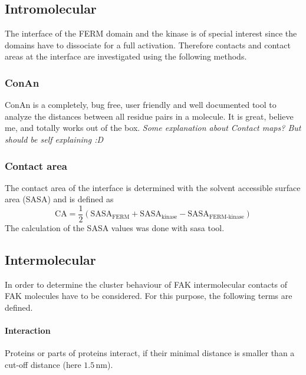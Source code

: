 \subsection{Intromolecular}
The interface of the FERM domain and the kinase is of special interest since the domains have to dissociate for a full activation. Therefore contacts and contact areas at the interface are investigated using the following methods.\\
\subsubsection{ConAn}
ConAn is a completely, bug free, user friendly and well documented tool to analyze the distances between all residue pairs in a molecule. It is great, believe me, and totally works out of the box. \textit{Some explanation about Contact maps? But should be self explaining :D}
\subsubsection{Contact area}
The contact area of the interface is determined with the solvent accessible surface area (SASA) and is defined as
\begin{equation}
	\text{CA} = \frac{1}{2} \left(\text{SASA}_\text{FERM} + \text{SASA}_\text{kinase} - \text{SASA}_\text{FERM-kinase}\right)
\end{equation}
The calculation of the SASA values was done with \gromacs{} sasa tool.
\subsection{Intermolecular}
In order to determine the cluster behaviour of FAK intermolecular contacts of FAK molecules have to be considered. For this purpose, the following terms are defined.
\paragraph{Interaction} Proteins or parts of proteins interact, if their minimal distance is smaller than a cut-off distance (here $1.5\,\si{\nano\metre}$).
